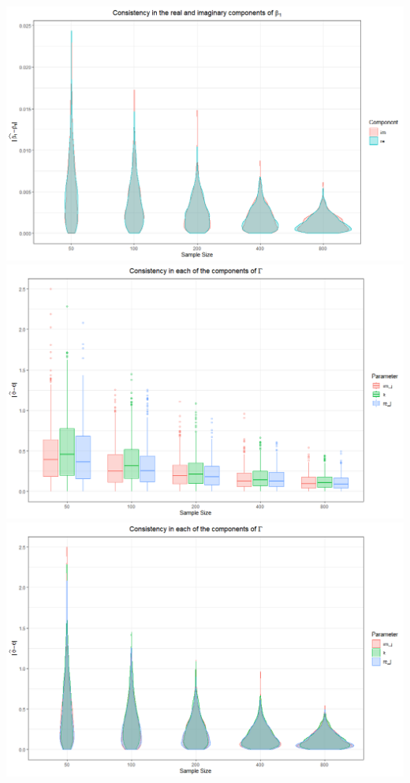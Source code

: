 \documentclass[honours,12pt]{unswthesis}
\numberwithin{equation}{section}
\begin{document}
\begin{center}
	\includegraphics[width = \textwidth]{graphics/CM_consistency_b1_v}
	\includegraphics[width = \textwidth]{graphics/CM_consistency_gam_b}
	\includegraphics[width = \textwidth]{graphics/CM_consistency_gam_v}
\end{center}
\end{document}
